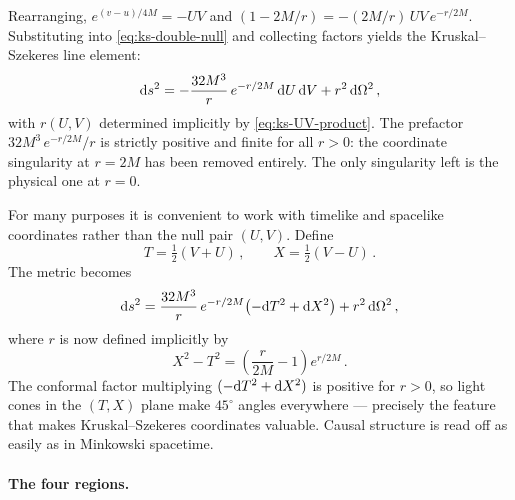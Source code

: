 Rearranging, $e^{(v-u)/4M} = -UV$ and
$(1 - 2M/r) = -(2M/r)\,UV\,e^{-r/2M}$.  Substituting into
\cref{eq:ks-double-null} and collecting factors yields the
Kruskal--Szekeres line element:
%
\begin{equation}
  \mathrm{d} s^2 = -\frac{32M^3}{r}\,e^{-r/2M}\,\mathrm{d} U\,\mathrm{d} V
           + r^2\,\mathrm{d}\Omega^2 \,,
  \label{eq:ks-metric-null}
\end{equation}
%
with $r(U,V)$ determined implicitly by \cref{eq:ks-UV-product}.
The prefactor $32M^3\,e^{-r/2M}/r$ is strictly positive and finite
for all $r > 0$: the coordinate singularity at $r = 2M$ has been
removed entirely.  The only singularity left is the physical one at
$r = 0$.

For many purposes it is convenient to work with timelike and
spacelike coordinates rather than the null pair $(U, V)$.
Define
%
\begin{equation}
  T = \tfrac{1}{2}(V + U) \,, \qquad
  X = \tfrac{1}{2}(V - U) \,.
  \label{eq:ks-TX-def}
\end{equation}
%
The metric becomes
%
\begin{equation}
  \mathrm{d} s^2 = \frac{32M^3}{r}\,e^{-r/2M}
    \bigl({-}\mathrm{d} T^2 + \mathrm{d} X^2\bigr)
    + r^2\,\mathrm{d}\Omega^2 \,,
  \label{eq:ks-metric}
\end{equation}
%
where $r$ is now defined implicitly by
%
\begin{equation}
  X^2 - T^2 = \left(\frac{r}{2M} - 1\right)e^{r/2M} \,.
  \label{eq:ks-r-implicit}
\end{equation}
%
The conformal factor multiplying $(-\mathrm{d} T^2 + \mathrm{d} X^2)$ is positive
for $r > 0$, so light cones in the $(T, X)$ plane make $45^\circ$
angles everywhere --- precisely the feature that makes
Kruskal--Szekeres coordinates valuable.  Causal structure is read
off as easily as in Minkowski spacetime.

\paragraph{The four regions.}

